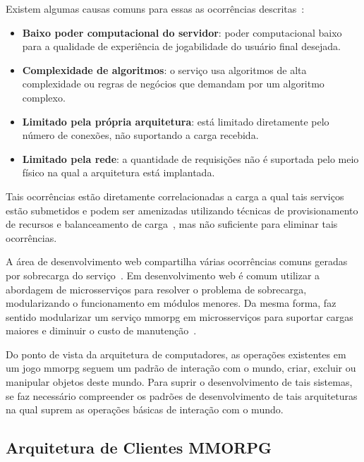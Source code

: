 Existem algumas causas comuns para essas as ocorrências descritas~\cite{1417630}:

\begin{itemize}
  \item \textbf{Baixo poder computacional do servidor}: poder computacional baixo para a qualidade de experiência de jogabilidade do usuário final desejada.
  \item \textbf{Complexidade de algoritmos}: o serviço usa algoritmos de alta complexidade ou regras de negócios que demandam por um algoritmo complexo.
  \item \textbf{Limitado pela própria arquitetura}: está limitado diretamente pelo número de conexões, não suportando a carga recebida.
  \item \textbf{Limitado pela rede}: a quantidade de requisições não é suportada pelo meio físico na qual a arquitetura está implantada.
\end{itemize}

Tais ocorrências estão diretamente correlacionadas a carga a qual tais serviços estão submetidos e podem ser amenizadas utilizando técnicas de provisionamento de recursos e balanceamento de carga~\cite{1417630}, mas não suficiente para eliminar tais ocorrências.

A área de desenvolvimento web compartilha várias ocorrências comuns geradas por sobrecarga do serviço~\cite{7830692}.
%
Em desenvolvimento web é comum utilizar a abordagem de microsserviços para resolver o problema de sobrecarga, modularizando o  funcionamento em módulos menores.
%
Da mesma forma, faz sentido modularizar um serviço \ac{mmorpg} em microsserviços para suportar cargas maiores e diminuir o custo de manutenção~\cite{7515686}.



Do ponto de vista da arquitetura de computadores, as operações existentes em um jogo \ac{mmorpg} seguem um padrão de interação com o mundo, criar, excluir ou manipular objetos deste mundo.
%
Para suprir o desenvolvimento de tais sistemas, se faz necessário compreender os padrões de desenvolvimento de tais arquiteturas na qual suprem as operações básicas de interação com o mundo.



\subsection{Arquitetura de Clientes MMORPG}
\label{sec:cliente}



